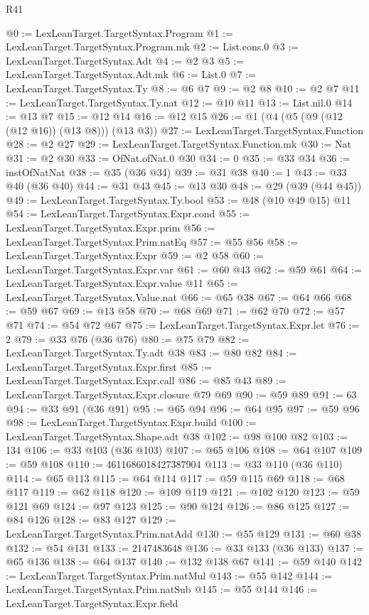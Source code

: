 \begin{lexlean}{R41}
\begin{coremodule}
@0 := LexLeanTarget.TargetSyntax.Program
@1 := LexLeanTarget.TargetSyntax.Program.mk
@2 := List.cons.{0}
@3 := LexLeanTarget.TargetSyntax.Adt
@4 := @2 @3
@5 := LexLeanTarget.TargetSyntax.Adt.mk
@6 := List.{0}
@7 := LexLeanTarget.TargetSyntax.Ty
@8 := @6 @7
@9 := @2 @8
@10 := @2 @7
@11 := LexLeanTarget.TargetSyntax.Ty.nat
@12 := @10 @11
@13 := List.nil.{0}
@14 := @13 @7
@15 := @12 @14
@16 := @12 @15
@26 := @1 (@4 (@5 (@9 (@12 (@12 @16)) (@13 @8))) (@13 @3))
@27 := LexLeanTarget.TargetSyntax.Function
@28 := @2 @27
@29 := LexLeanTarget.TargetSyntax.Function.mk
@30 := Nat
@31 := @2 @30
@33 := OfNat.ofNat.{0} @30
@34 := 0
@35 := @33 @34
@36 := instOfNatNat
@38 := @35 (@36 @34)
@39 := @31 @38
@40 := 1
@43 := @33 @40 (@36 @40)
@44 := @31 @43
@45 := @13 @30
@48 := @29 (@39 (@44 @45))
@49 := LexLeanTarget.TargetSyntax.Ty.bool
@53 := @48 (@10 @49 @15) @11
@54 := LexLeanTarget.TargetSyntax.Expr.cond
@55 := LexLeanTarget.TargetSyntax.Expr.prim
@56 := LexLeanTarget.TargetSyntax.Prim.natEq
@57 := @55 @56
@58 := LexLeanTarget.TargetSyntax.Expr
@59 := @2 @58
@60 := LexLeanTarget.TargetSyntax.Expr.var
@61 := @60 @43
@62 := @59 @61
@64 := LexLeanTarget.TargetSyntax.Expr.value @11
@65 := LexLeanTarget.TargetSyntax.Value.nat
@66 := @65 @38
@67 := @64 @66
@68 := @59 @67
@69 := @13 @58
@70 := @68 @69
@71 := @62 @70
@72 := @57 @71
@74 := @54 @72 @67
@75 := LexLeanTarget.TargetSyntax.Expr.let
@76 := 2
@79 := @33 @76 (@36 @76)
@80 := @75 @79
@82 := LexLeanTarget.TargetSyntax.Ty.adt @38
@83 := @80 @82
@84 := LexLeanTarget.TargetSyntax.Expr.first
@85 := LexLeanTarget.TargetSyntax.Expr.call
@86 := @85 @43
@89 := LexLeanTarget.TargetSyntax.Expr.closure @79 @69
@90 := @59 @89
@91 := 63
@94 := @33 @91 (@36 @91)
@95 := @65 @94
@96 := @64 @95
@97 := @59 @96
@98 := LexLeanTarget.TargetSyntax.Expr.build
@100 := LexLeanTarget.TargetSyntax.Shape.adt @38
@102 := @98 @100 @82
@103 := 134
@106 := @33 @103 (@36 @103)
@107 := @65 @106
@108 := @64 @107
@109 := @59 @108
@110 := 4611686018427387904
@113 := @33 @110 (@36 @110)
@114 := @65 @113
@115 := @64 @114
@117 := @59 @115 @69
@118 := @68 @117
@119 := @62 @118
@120 := @109 @119
@121 := @102 @120
@123 := @59 @121 @69
@124 := @97 @123
@125 := @90 @124
@126 := @86 @125
@127 := @84 @126
@128 := @83 @127
@129 := LexLeanTarget.TargetSyntax.Prim.natAdd
@130 := @55 @129
@131 := @60 @38
@132 := @54 @131
@133 := 2147483648
@136 := @33 @133 (@36 @133)
@137 := @65 @136
@138 := @64 @137
@140 := @132 @138 @67
@141 := @59 @140
@142 := LexLeanTarget.TargetSyntax.Prim.natMul
@143 := @55 @142
@144 := LexLeanTarget.TargetSyntax.Prim.natSub
@145 := @55 @144
@146 := LexLeanTarget.TargetSyntax.Expr.field

\end{coremodule}
\end{lexlean}
